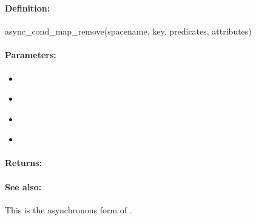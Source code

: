 \pagebreak
\subsubsection{}
\label{api:ruby:async_cond_map_remove}


\paragraph{Definition:}
\begin{rubycode}
async_cond_map_remove(spacename, key, predicates, attributes)
\end{rubycode}

\paragraph{Parameters:}
\begin{itemize}[noitemsep]
\item {}\\

\item {}\\

\item {}\\

\item {}\\

\end{itemize}

\paragraph{Returns:}


\paragraph{See also:}  This is the asynchronous form of .

\pagebreak
\subsubsection{}
\label{api:ruby:group_map_remove}


